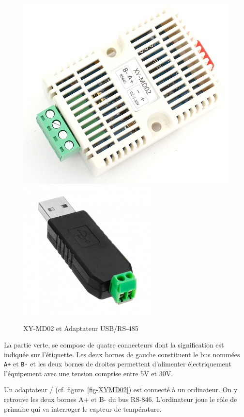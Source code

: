 \begin{figure}[tbp]
\centerline{\includegraphics[width=0.6\columnwidth]{Pictures/XY-MD02.png}\includegraphics[width=0.4\columnwidth]{Pictures/rs485-usb.png}}
\caption{XY-MD02 et Adaptateur USB/RS-485}
\label{fig-XYMD02}
\end{figure}

La partie verte, se compose de quatre connecteurs dont la signification est indiquée sur l'étiquette. Les deux bornes de gauche constituent le bus  nommées \texttt{A+} et \texttt{B-} et les deux bornes de droites permettent d'alimenter électriquement l'équipement avec une tension comprise entre 5V et 30V.

    \vspace{1em}

 \begin{figure}
\end{figure}

Un adaptateur / (cf. figure~\vref{fig-XYMD02}) est connecté à un ordinateur. On y retrouve les deux bornes A+ et B- du bus RS-846. L'ordinateur joue le rôle de primaire qui va interroger le capteur de température.  


    \vspace{1em}

